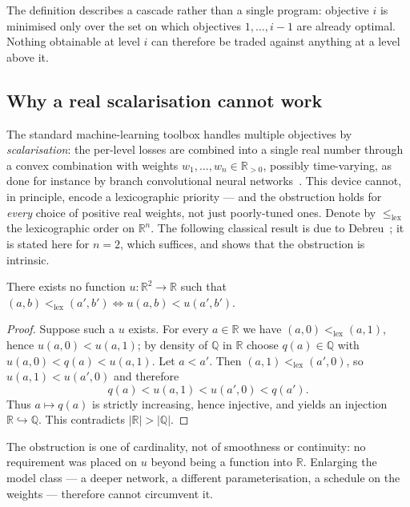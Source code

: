 The definition describes a cascade rather than a single program: objective $i$ is
minimised only over the set on which objectives $1,\dots,i-1$ are already optimal.
Nothing obtainable at level $i$ can therefore be traded against anything at a level
above it.

\subsection{Why a real scalarisation cannot work}
\label{sec:lexico-real}

The standard machine-learning toolbox handles multiple objectives by
\emph{scalarisation}: the per-level losses are combined into a single real number
through a convex combination with weights $w_1,\dots,w_n \in \mathbb{R}_{>0}$,
possibly time-varying, as done for instance by branch convolutional neural
networks~\cite{zhu2017bcnn}. This device cannot, in principle, encode a lexicographic
priority --- and the obstruction holds for \emph{every} choice of positive real
weights, not just poorly-tuned ones. Denote by $\le_{\mathrm{lex}}$ the lexicographic
order on $\mathbb{R}^{n}$. The following classical result is due to
Debreu~\cite{debreu1954representation}; it is stated here for $n=2$, which suffices,
and shows that the obstruction is intrinsic.

\begin{proposition}
\label{prop:debreu}
There exists no function $u : \mathbb{R}^{2} \to \mathbb{R}$ such that
$(a,b) <_{\mathrm{lex}} (a',b') \iff u(a,b) < u(a',b')$.
\end{proposition}

\begin{proof}
Suppose such a $u$ exists. For every $a \in \mathbb{R}$ we have
$(a,0) <_{\mathrm{lex}} (a,1)$, hence $u(a,0) < u(a,1)$; by density of $\mathbb{Q}$ in
$\mathbb{R}$ choose $q(a) \in \mathbb{Q}$ with $u(a,0) < q(a) < u(a,1)$. Let $a < a'$.
Then $(a,1) <_{\mathrm{lex}} (a',0)$, so $u(a,1) < u(a',0)$ and therefore
\[
  q(a) < u(a,1) < u(a',0) < q(a').
\]
Thus $a \mapsto q(a)$ is strictly increasing, hence injective, and yields an injection
$\mathbb{R} \hookrightarrow \mathbb{Q}$. This contradicts $|\mathbb{R}| > |\mathbb{Q}|$.
\end{proof}

The obstruction is one of cardinality, not of smoothness or continuity: no
requirement was placed on $u$ beyond being a function into $\mathbb{R}$. Enlarging
the model class --- a deeper network, a different parameterisation, a schedule on the
weights --- therefore cannot circumvent it.

